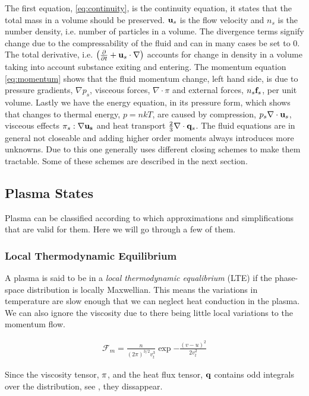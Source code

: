 	The first equation, \cref{eq:continuity}, is the continuity equation, it states that the total mass
	in a volume	should be preserved. \(\vb{u}_s\) is the flow velocity and \(n_s\) is the number density, i.e.
	number of particles in a volume. The divergence terms signify change due to the compressability of the fluid
	and can in many cases be set to \(0\). The total derivative, i.e. \(\left(\pdv{t} + \vb{u}_s\cdot\nabla \right)\) accounts for
	change in density in a volume taking into account substance exiting and entering.
	The momentum equation \cref{eq:momentum} shows that the fluid momentum change, left hand side,
	is due to pressure gradients, \(\nabla p_s\), visceous forces, \(\nabla \cdot \pi \) and external forces, \(n_s\vb{f}_s\),
	per unit volume.
	Lastly we have the energy equation, in its pressure form, which shows that changes to thermal
	energy, \(p = nkT\), are caused by compression, \(p_s\nabla \cdot \vb{u}_s\), visceous effects \(\pi_s : \nabla{\vb{u_s}}\)
	and heat transport	\(\frac{2}{3}\nabla \cdot \vb{q}_s\).
	The fluid equations are in general not closeable and adding higher order moments
	always introduces more unknowns. Due to this one generally uses different closing
	schemes to make them tractable. Some of these schemes are described in the next section.

\subsection{Plasma States}
	Plasma can be classified according to which	approximations and simplifications
	that are valid for them. Here we will go through a few of them.

	\subsubsection{Local Thermodynamic Equilibrium}
	A plasma is said to be in a \textit{local thermodynamic equalibrium} (LTE)
	if the phase-space distribution is locally Maxwellian. This means the variations
	in temperature are slow enough that we can neglect heat conduction in the plasma. We can also ignore
	the viscosity due to there being little local variations to the momentum flow.

	\begin{align}
		\mathcal{F}_m = \frac{n}{(2\pi )^{3/2}v_t^3} \exp{-\frac{(v-u)^2}{2v_t^2}}
	\end{align}

	Since the viscosity tensor, \(\vb{\pi}\), and the heat flux tensor, \(\vb{q}\)
	contains odd integrals over the distribution, see \citet{fitzpatrick_plasma_2014},
	they dissappear.

